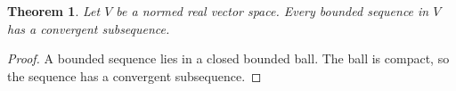 \documentclass{article}
\newtheorem{theorem}{Theorem}
\begin{document}
\begin{theorem}\label{thm:arbitrary-dimensional-subsequence-gap}
Let $V$ be a normed real vector space. Every bounded sequence in $V$ has a convergent subsequence.
\end{theorem}
\begin{proof}
A bounded sequence lies in a closed bounded ball. The ball is compact, so the sequence has a convergent subsequence.
\end{proof}
\end{document}

